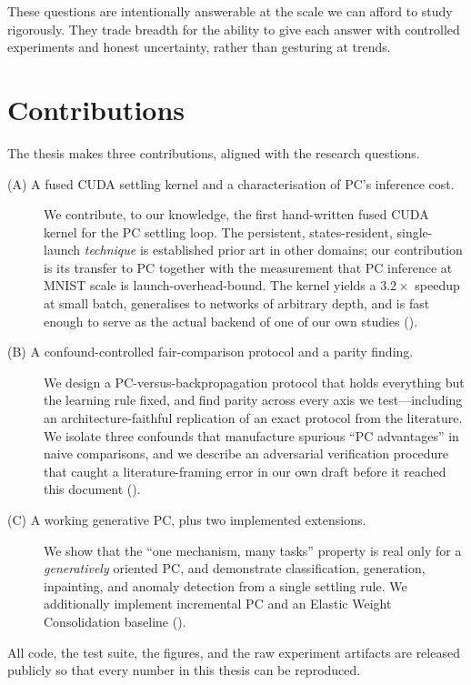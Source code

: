 These questions are intentionally answerable at the scale we can afford to study rigorously. They
trade breadth for the ability to give each answer with controlled experiments and honest
uncertainty, rather than gesturing at trends.

\section{Contributions}

The thesis makes three contributions, aligned with the research questions.

\begin{description}
  \item[(A) A fused CUDA settling kernel and a characterisation of PC's inference cost.] We
    contribute, to our knowledge, the first hand-written fused CUDA kernel for the PC settling
    loop. The persistent, states-resident, single-launch \emph{technique} is established prior art
    in other domains; our contribution is its transfer to PC together with the measurement that
    PC inference at MNIST scale is launch-overhead-bound. The kernel yields a $3.2\times$ speedup
    at small batch, generalises to networks of arbitrary depth, and is fast enough to serve as
    the actual backend of one of our own studies ().
  \item[(B) A confound-controlled fair-comparison protocol and a parity finding.] We design a
    PC-versus-backpropagation protocol that holds everything but the learning rule fixed, and find
    parity across every axis we test---including an architecture-faithful replication of an exact
    protocol from the literature. We isolate three confounds that manufacture spurious
    ``PC advantages'' in naive comparisons, and we describe an adversarial verification procedure
    that caught a literature-framing error in our own draft before it reached this document
    ().
  \item[(C) A working generative PC, plus two implemented extensions.] We show that the
    ``one mechanism, many tasks'' property is real only for a \emph{generatively} oriented PC, and
    demonstrate classification, generation, inpainting, and anomaly detection from a single
    settling rule. We additionally implement incremental PC and an Elastic Weight Consolidation
    baseline ().
\end{description}

All code, the test suite, the figures, and the raw experiment artifacts are released publicly so
that every number in this thesis can be reproduced.

